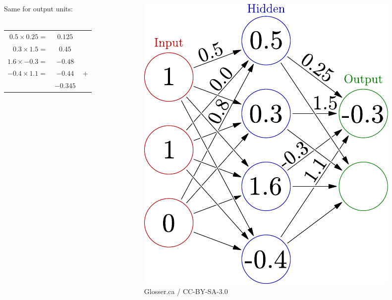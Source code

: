 \documentclass{beamer}
\begin{document}
\begin{frame}
\begin{columns}[T]
\begin{column}{.5\textwidth}
Same for output units: \\
\ \\
\begin{tabular}{r S[tabformat=3.2] r}%
 $0.5 \times 0.25 =$ & $0.125$ &\\
 $0.3 \times 1.5  =$ & $0.45$ &\\
 $1.6 \times -0.3 =$ & $-0.48$ &\\
 $-0.4 \times 1.1 =$ & $-0.44$ & + \\
 \hline
 & $-0.345$ & 
\end{tabular}
    \end{column}
    \begin{column}{.5\textwidth}
\begin{figure}
 \centering
 \includegraphics[width=\linewidth]{./fig/3-layer_propagate.pdf}
  \caption{Glosser.ca / CC-BY-SA-3.0}
\end{figure}
    \end{column}
  \end{columns}
\end{frame}
\end{document}
